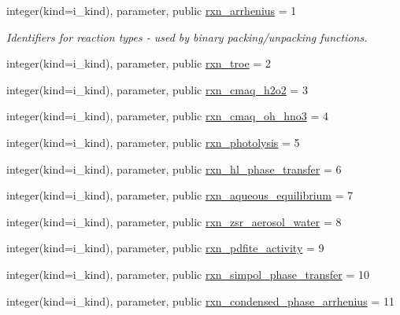 \begin{DoxyCompactItemize}
\item 
integer(kind=i\+\_\+kind), parameter, public \mbox{\hyperlink{namespacepmc__rxn__factory_a8982f1039d9dbeb96d3417eb30e356a0}{rxn\+\_\+arrhenius}} = 1
\begin{DoxyCompactList}\small\item\em Identifiers for reaction types -\/ used by binary packing/unpacking functions. \end{DoxyCompactList}\item 
integer(kind=i\+\_\+kind), parameter, public \mbox{\hyperlink{namespacepmc__rxn__factory_a5142ca027ce9f54cc7c4e49542e9bd0e}{rxn\+\_\+troe}} = 2
\item 
integer(kind=i\+\_\+kind), parameter, public \mbox{\hyperlink{namespacepmc__rxn__factory_a776416a03ead756bd1cd206f93b763a6}{rxn\+\_\+cmaq\+\_\+h2o2}} = 3
\item 
integer(kind=i\+\_\+kind), parameter, public \mbox{\hyperlink{namespacepmc__rxn__factory_aeb0e4677c84b942a0f1867a218a15404}{rxn\+\_\+cmaq\+\_\+oh\+\_\+hno3}} = 4
\item 
integer(kind=i\+\_\+kind), parameter, public \mbox{\hyperlink{namespacepmc__rxn__factory_a0b06d4f20aae6434f216c79c418b256f}{rxn\+\_\+photolysis}} = 5
\item 
integer(kind=i\+\_\+kind), parameter, public \mbox{\hyperlink{namespacepmc__rxn__factory_a8bf11f3e9a41f57cdb9232682785ff4d}{rxn\+\_\+hl\+\_\+phase\+\_\+transfer}} = 6
\item 
integer(kind=i\+\_\+kind), parameter, public \mbox{\hyperlink{namespacepmc__rxn__factory_a55e52865bc0c395f5cd41bfd3ef382e0}{rxn\+\_\+aqueous\+\_\+equilibrium}} = 7
\item 
integer(kind=i\+\_\+kind), parameter, public \mbox{\hyperlink{namespacepmc__rxn__factory_a67e274f604a27f1d65091919ee92e105}{rxn\+\_\+zsr\+\_\+aerosol\+\_\+water}} = 8
\item 
integer(kind=i\+\_\+kind), parameter, public \mbox{\hyperlink{namespacepmc__rxn__factory_a3f039b0ac4cb1d88973935c55c763588}{rxn\+\_\+pdfite\+\_\+activity}} = 9
\item 
integer(kind=i\+\_\+kind), parameter, public \mbox{\hyperlink{namespacepmc__rxn__factory_a1ba2b8ba97a5327f1dcdafd63538b7a6}{rxn\+\_\+simpol\+\_\+phase\+\_\+transfer}} = 10
\item 
integer(kind=i\+\_\+kind), parameter, public \mbox{\hyperlink{namespacepmc__rxn__factory_ab0ee1f4ac771d7eaedf88c5e10118a5b}{rxn\+\_\+condensed\+\_\+phase\+\_\+arrhenius}} = 11
\end{DoxyCompactItemize}


